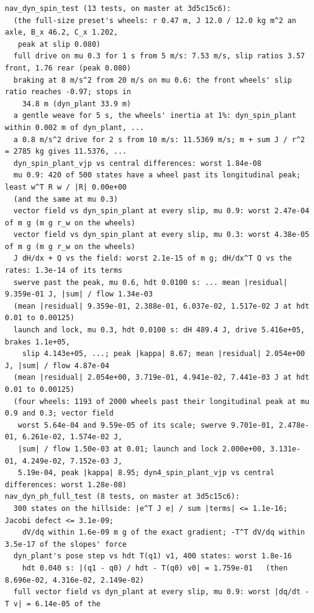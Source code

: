 \documentclass[11pt]{article}
\theoremstyle{remark}
\begin{document}
\begin{center}
\begin{minipage}{0.98\linewidth}
\scriptsize
\begin{verbatim}
nav_dyn_spin_test (13 tests, on master at 3d5c15c6):
  (the full-size preset's wheels: r 0.47 m, J 12.0 / 12.0 kg m^2 an axle, B_x 46.2, C_x 1.202,
   peak at slip 0.080)
  full drive on mu 0.3 for 1 s from 5 m/s: 7.53 m/s, slip ratios 3.57 front, 1.76 rear (peak 0.080)
  braking at 8 m/s^2 from 20 m/s on mu 0.6: the front wheels' slip ratio reaches -0.97; stops in
    34.8 m (dyn_plant 33.9 m)
  a gentle weave for 5 s, the wheels' inertia at 1%: dyn_spin_plant within 0.002 m of dyn_plant, ...
  a 0.8 m/s^2 drive for 2 s from 10 m/s: 11.5369 m/s; m + sum J / r^2 = 2785 kg gives 11.5376, ...
  dyn_spin_plant_vjp vs central differences: worst 1.84e-08
  mu 0.9: 420 of 500 states have a wheel past its longitudinal peak; least w^T R w / |R| 0.00e+00
  (and the same at mu 0.3)
  vector field vs dyn_spin_plant at every slip, mu 0.9: worst 2.47e-04 of m g (m g r_w on the wheels)
  vector field vs dyn_spin_plant at every slip, mu 0.3: worst 4.38e-05 of m g (m g r_w on the wheels)
  J dH/dx + Q vs the field: worst 2.1e-15 of m g; dH/dx^T Q vs the rates: 1.3e-14 of its terms
  swerve past the peak, mu 0.6, hdt 0.0100 s: ... mean |residual| 9.359e-01 J, |sum| / flow 1.34e-03
  (mean |residual| 9.359e-01, 2.388e-01, 6.037e-02, 1.517e-02 J at hdt 0.01 to 0.00125)
  launch and lock, mu 0.3, hdt 0.0100 s: dH 489.4 J, drive 5.416e+05, brakes 1.1e+05,
    slip 4.143e+05, ...; peak |kappa| 8.67; mean |residual| 2.054e+00 J, |sum| / flow 4.87e-04
  (mean |residual| 2.054e+00, 3.719e-01, 4.941e-02, 7.441e-03 J at hdt 0.01 to 0.00125)
  (four wheels: 1193 of 2000 wheels past their longitudinal peak at mu 0.9 and 0.3; vector field
   worst 5.64e-04 and 9.59e-05 of its scale; swerve 9.701e-01, 2.478e-01, 6.261e-02, 1.574e-02 J,
   |sum| / flow 1.50e-03 at 0.01; launch and lock 2.000e+00, 3.131e-01, 4.249e-02, 7.152e-03 J,
   5.19e-04, peak |kappa| 8.95; dyn4_spin_plant_vjp vs central differences: worst 1.28e-08)
nav_dyn_ph_full_test (8 tests, on master at 3d5c15c6):
  300 states on the hillside: |e^T J e| / sum |terms| <= 1.1e-16; Jacobi defect <= 3.1e-09;
    dV/dq within 1.6e-09 m g of the exact gradient; -T^T dV/dq within 3.5e-17 of the slopes' force
  dyn_plant's pose step vs hdt T(q1) v1, 400 states: worst 1.8e-16
    hdt 0.040 s: |(q1 - q0) / hdt - T(q0) v0| = 1.759e-01   (then 8.696e-02, 4.316e-02, 2.149e-02)
  full vector field vs dyn_plant at every slip, mu 0.9: worst |dq/dt - T v| = 6.14e-05 of the

\end{verbatim}
\end{minipage}
\end{center}
\end{document}

